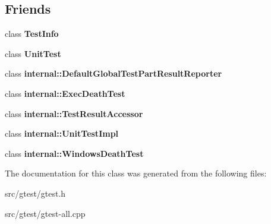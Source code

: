 \subsection*{Friends}
\begin{DoxyCompactItemize}
\item 
\mbox{\label{classtesting_1_1_test_result_a4c49c2cdb6c328e6b709b4542f23de3c}} 
class {\bfseries Test\+Info}
\item 
\mbox{\label{classtesting_1_1_test_result_a832b4d233efee1a32feb0f4190b30d39}} 
class {\bfseries Unit\+Test}
\item 
\mbox{\label{classtesting_1_1_test_result_abae39633da9932847b41cb80efd62115}} 
class {\bfseries internal\+::\+Default\+Global\+Test\+Part\+Result\+Reporter}
\item 
\mbox{\label{classtesting_1_1_test_result_adf5553cae6aea6f8648d47e299237e34}} 
class {\bfseries internal\+::\+Exec\+Death\+Test}
\item 
\mbox{\label{classtesting_1_1_test_result_ae762da04e74a0d3b0daded3c5bd4a8e8}} 
class {\bfseries internal\+::\+Test\+Result\+Accessor}
\item 
\mbox{\label{classtesting_1_1_test_result_acc0a5e7573fd6ae7ad1878613bb86853}} 
class {\bfseries internal\+::\+Unit\+Test\+Impl}
\item 
\mbox{\label{classtesting_1_1_test_result_a6aeedc04a0590fcc1b3c5f687dbb0f9f}} 
class {\bfseries internal\+::\+Windows\+Death\+Test}
\end{DoxyCompactItemize}


The documentation for this class was generated from the following files\+:\begin{DoxyCompactItemize}
\item 
src/gtest/gtest.\+h\item 
src/gtest/gtest-\/all.\+cpp\end{DoxyCompactItemize}
